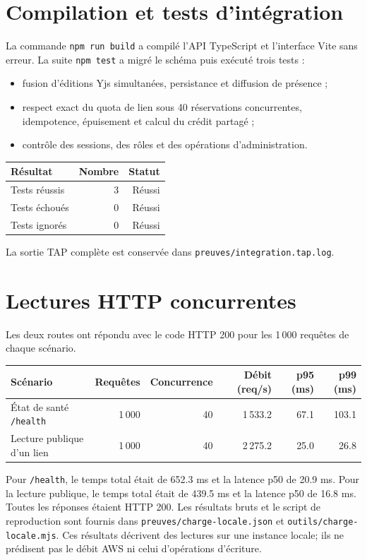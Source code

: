 \documentclass[11pt,a4paper,oneside]{report}
\begin{document}
\section{Compilation et tests d’intégration}
La commande \texttt{npm run build} a compilé l’API TypeScript et l’interface Vite sans erreur. La suite \texttt{npm test} a migré le schéma puis exécuté trois tests :
\begin{itemize}
  \item fusion d’éditions Yjs simultanées, persistance et diffusion de présence ;
  \item respect exact du quota de lien sous 40 réservations concurrentes, idempotence, épuisement et calcul du crédit partagé ;
  \item contrôle des sessions, des rôles et des opérations d’administration.
\end{itemize}

\begin{center}
\begin{tabular}{@{}lrr@{}}
\toprule
Résultat & Nombre & Statut\\
\midrule
Tests réussis & 3 & Réussi\\
Tests échoués & 0 & Réussi\\
Tests ignorés & 0 & Réussi\\
\bottomrule
\end{tabular}
\end{center}
La sortie TAP complète est conservée dans \texttt{preuves/integration.tap.log}.

\section{Lectures HTTP concurrentes}
Les deux routes ont répondu avec le code HTTP 200 pour les 1\,000 requêtes de chaque scénario.

\begin{center}
\small
\begin{tabularx}{\textwidth}{@{}Xrrrrr@{}}
\toprule
Scénario & Requêtes & Concurrence & Débit (req/s) & p95 (ms) & p99 (ms)\\
\midrule
État de santé \texttt{/health} & 1\,000 & 40 & 1\,533.2 & 67.1 & 103.1\\
Lecture publique d’un lien & 1\,000 & 40 & 2\,275.2 & 25.0 & 26.8\\
\bottomrule
\end{tabularx}
\end{center}

Pour \texttt{/health}, le temps total était de 652.3 ms et la latence p50 de 20.9 ms. Pour la lecture publique, le temps total était de 439.5 ms et la latence p50 de 16.8 ms. Toutes les réponses étaient HTTP 200. Les résultats bruts et le script de reproduction sont fournis dans \texttt{preuves/charge-locale.json} et \texttt{outils/charge-locale.mjs}. Ces résultats décrivent des lectures sur une instance locale; ils ne prédisent pas le débit AWS ni celui d’opérations d’écriture.
\end{document}
